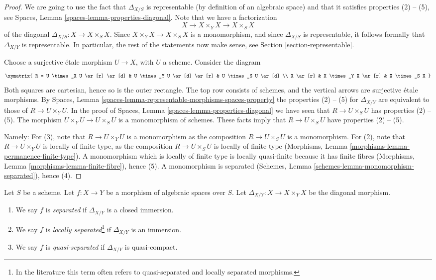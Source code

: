 \begin{proof}
We are going to use the fact that $\Delta_{X/S}$ is
representable (by definition of an algebraic space) and that
it satisfies properties (2) -- (5), see
Spaces, Lemma \ref{spaces-lemma-properties-diagonal}.
Note that we have a factorization
$$
X
\longrightarrow
X \times_Y X
\longrightarrow
X \times_S X
$$
of the diagonal $\Delta_{X/S} : X \to X \times_S X$. Since
$X \times_Y X \to X \times_S X$ is a monomorphism, and since
$\Delta_{X/S}$ is representable, it follows formally that
$\Delta_{X/Y}$ is representable. In particular, the rest of
the statements now make sense, see
Section \ref{section-representable}.

\medskip\noindent
Choose a surjective \'etale morphism $U \to X$, with $U$ a scheme.
Consider the diagram
$$
\xymatrix{
R = U \times_X U \ar[r] \ar[d] &
U \times_Y U \ar[d] \ar[r] &
U \times_S U \ar[d] \\
X \ar[r] & X \times_Y X \ar[r] & X \times_S X
}
$$
Both squares are cartesian, hence so is the outer rectangle.
The top row consists of schemes, and the vertical arrows
are surjective \'etale morphisms. By
Spaces, Lemma \ref{spaces-lemma-representable-morphisms-spaces-property}
the properties (2) -- (5) for $\Delta_{X/Y}$ are equivalent to those of
$R \to U \times_Y U$. In the proof of
Spaces, Lemma \ref{spaces-lemma-properties-diagonal}
we have seen that $R \to U \times_S U$ has properties (2) -- (5).
The morphism $U \times_Y U \to U \times_S U$ is a monomorphism
of schemes. These facts imply that $R \to U \times_S U$ have
properties (2) -- (5).

\medskip\noindent
Namely: For (3), note that $R \to U \times_Y U$
is a monomorphism as the composition
$R \to U \times_S U$ is a monomorphism. For (2), note that
$R \to U \times_Y U$ is locally of finite type, as the
composition $R \to U \times_S U$ is locally of finite type
(Morphisms, Lemma \ref{morphisms-lemma-permanence-finite-type}).
A monomorphism which is locally of finite type is locally quasi-finite
because it has finite fibres
(Morphisms, Lemma \ref{morphisms-lemma-finite-fibre}), hence (5).
A monomorphism is separated
(Schemes, Lemma \ref{schemes-lemma-monomorphism-separated}), hence (4).
\end{proof}

\begin{definition}
\label{definition-separated}
Let $S$ be a scheme.
Let $f : X \to Y$ be a morphism of algebraic spaces over $S$.
Let $\Delta_{X/Y} : X \to X \times_Y X$ be the diagonal morphism.
\begin{enumerate}
\item We say $f$ is {\it separated} if $\Delta_{X/Y}$ is a closed immersion.
\item We say $f$ is {\it locally separated}\footnote{In the literature
this term often refers to quasi-separated and locally separated morphisms.}
if $\Delta_{X/Y}$ is an immersion.
\item We say $f$ is {\it quasi-separated} if $\Delta_{X/Y}$ is quasi-compact.
\end{enumerate}
\end{definition}


